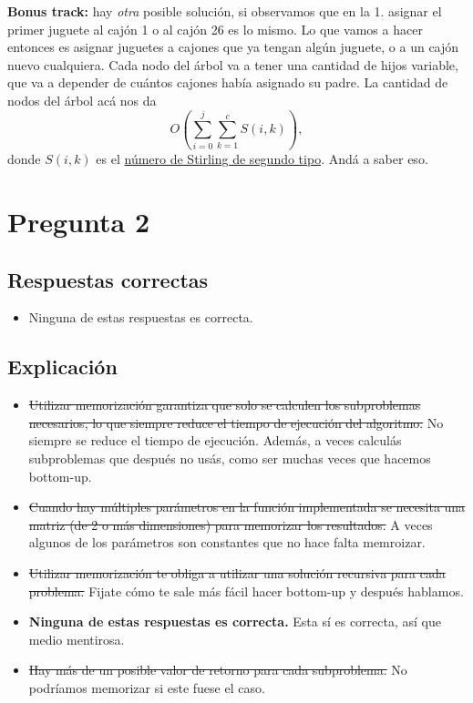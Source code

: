 \documentclass{article}
\begin{document}
\textbf{Bonus track:} hay \textit{otra} posible solución, si observamos que en la 1. asignar el primer juguete al cajón 1 o al cajón 26 es lo mismo. Lo que vamos a hacer entonces es asignar juguetes a cajones que ya tengan algún juguete, o a un cajón nuevo cualquiera. Cada nodo del árbol va a tener una cantidad de hijos variable, que va a depender de cuántos cajones había asignado su padre. La cantidad de nodos del árbol acá nos da 
\[
O\left(\sum_{i=0}^j \sum_{k=1}^c S(i, k)\right),
\]
donde $S(i, k)$ es el \href{https://en.wikipedia.org/wiki/Stirling_numbers_of_the_second_kind}{número de Stirling de segundo tipo}. Andá a saber eso.

\section*{Pregunta 2}
\subsection*{Respuestas correctas}
\begin{itemize}
    \item Ninguna de estas respuestas es correcta.
\end{itemize}

\subsection*{Explicación}
\begin{itemize}
    \item \sout{Utilizar memorización garantiza que solo se calculen los subproblemas necesarios, lo que siempre reduce el tiempo de ejecución del algoritmo.} No siempre se reduce el tiempo de ejecución. Además, a veces calculás subproblemas que después no usás, como ser muchas veces que hacemos bottom-up.
    \item \sout{Cuando hay múltiples parámetros en la función implementada se necesita una matriz (de 2 o más dimensiones) para memorizar los resultados.} A veces algunos de los parámetros son constantes que no hace falta memroizar.
    \item \sout{Utilizar memorización te obliga a utilizar una solución recursiva para cada problema.} Fijate cómo te sale más fácil hacer bottom-up y después hablamos.
    \item \textbf{Ninguna de estas respuestas es correcta.} Esta sí es correcta, así que medio mentirosa.
    \item \sout{Hay más de un posible valor de retorno para cada subproblema.} No podríamos memorizar si este fuese el caso.
\end{itemize}
\end{document}
